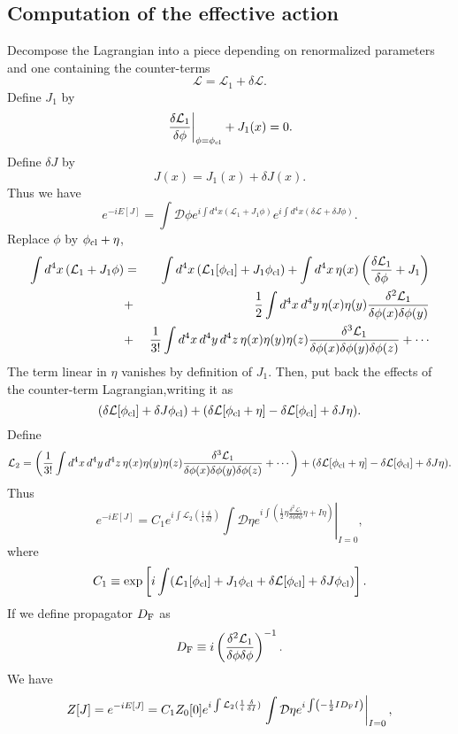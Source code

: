 \subsection{Computation of the effective action}
Decompose the Lagrangian into a piece depending on renormalized parameters and one containing the counter-terms
\[\mathcal{L} = \mathcal{L}_1 + \delta \mathcal{L}.\]
Define $J_1$ by
\[\left. \frac{\delta \mathcal{L}_1}{\delta \phi} \right|_{\phi = \phi_{\rm cl}} + J_1(x) = 0.\]
Define $\delta J$ by
\[J(x) = J_1(x) + \delta J(x).\]
Thus we have
\[e^{-iE[J]} = \int \mathcal{D}\phi e^{i\int d^4x (\mathcal{L}_1 + J_1\phi)} e^{i\int d^4x (\delta \mathcal{L} + \delta J \phi)}.\]
Replace $\phi$ by $\phi_{\rm cl}+\eta$,
\begin{eqnarray}
\int d^4x \, (\mathcal{L}_1 + J_1\phi) &=& \int d^4x \, (\mathcal{L}_1[\phi_{\rm cl}] + J_1\phi_{\rm cl}) + \int d^4x \, \eta(x) \left( \frac{\delta \mathcal{L}_1}{\delta \phi} + J_1 \right) \nonumber \\
&+& \frac{1}{2} \int d^4x \, d^4y \, \eta(x) \eta(y) \frac{\delta^2 \mathcal{L}_1}{\delta \phi(x) \delta \phi(y)} \nonumber \\
&+& \frac{1}{3!} \int d^4x \, d^4y \, d^4z \, \eta(x) \eta(y) \eta(z) \frac{\delta^3 \mathcal{L}_1}{\delta \phi(x) \delta \phi(y) \delta \phi(z)} + \cdots \nonumber
\end{eqnarray}
The term linear in $\eta$ vanishes by definition of $J_1$. 
Then, put back the effects of the counter-term Lagrangian,writing it as
\[(\delta \mathcal{L}[\phi_{\rm cl}] + \delta J \phi_{\rm cl} ) + ( \delta \mathcal{L}[\phi_{\rm cl} + \eta] - \delta\mathcal{L} [\phi_{\rm cl}] + \delta J \eta).\]
Define
\[\mathcal{L}_2 = \left(\frac{1}{3!} \int d^4x \, d^4y \, d^4z \, \eta(x) \eta(y) \eta(z) \frac{\delta^3 \mathcal{L}_1}{\delta \phi(x) \delta \phi(y) \delta \phi(z)} + \cdots \right) + ( \delta \mathcal{L}[\phi_{\rm cl} + \eta] - \delta\mathcal{L} [\phi_{\rm cl}] + \delta J \eta).\]
Thus
\[e^{-iE[J]} = C_1 e^{i\int \mathcal{L}_2(\frac{1}{i} \frac{\delta}{\delta I})} \left. \int \mathcal{D}\eta e^{i\int \left(\frac{1}{2} \eta \frac{\delta^2 \mathcal{L}_1}{\delta \phi \delta \phi} \eta + I\eta \right)} \right|_{I=0},\]
where
\[C_1 \equiv \exp \left[ i \int ( \mathcal{L}_1 [\phi_{\rm cl}] + J_1\phi_{\rm cl} + \delta \mathcal{L}[\phi_{\rm cl}] + \delta J \phi_{\rm cl} )\right].\]
If we define propagator $D_{\rm F}$ as
\[D_{\rm F} \equiv i \left( \frac{\delta^2 \mathcal{L}_1}{\delta \phi \delta \phi}\right)^{-1}.\]
We have
\[Z[J] = e^{-iE[J]} =C_1 Z_0[0] e^{i\int \mathcal{L}_2(\frac{1}{i} \frac{\delta}{\delta I})} \left. \int \mathcal{D}\eta e^{i\int \left(-\frac{1}{2} I D_{\rm F} I \right)} \right|_{I=0},\]
